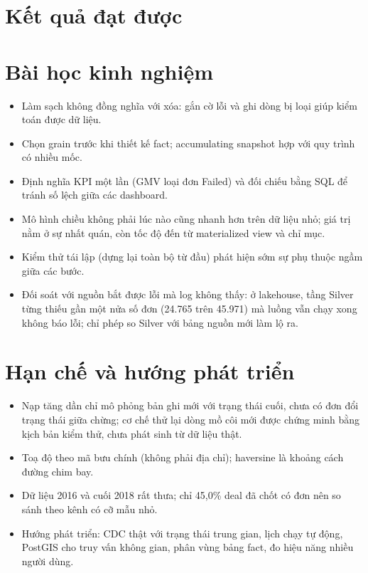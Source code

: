 \section{Kết quả đạt được}

\section{Bài học kinh nghiệm}
\begin{itemize}
  \item Làm sạch không đồng nghĩa với xóa: gắn cờ lỗi và ghi dòng bị loại giúp kiểm toán được dữ liệu.
  \item Chọn grain trước khi thiết kế fact; accumulating snapshot hợp với quy trình có nhiều mốc.
  \item Định nghĩa KPI một lần (GMV loại đơn Failed) và đối chiếu bằng SQL để tránh số lệch giữa các dashboard.
  \item Mô hình chiều không phải lúc nào cũng nhanh hơn trên dữ liệu nhỏ; giá trị nằm ở sự nhất quán, còn tốc độ đến từ materialized view và chỉ mục.
  \item Kiểm thử tái lập (dựng lại toàn bộ từ đầu) phát hiện sớm sự phụ thuộc ngầm giữa các bước.
  \item Đối soát với nguồn bắt được lỗi mà log không thấy: ở lakehouse, tầng Silver từng thiếu gần một nửa số đơn (24.765 trên 45.971) mà luồng vẫn chạy xong không báo lỗi; chỉ phép so Silver với bảng nguồn mới làm lộ ra.
\end{itemize}

\section{Hạn chế và hướng phát triển}
\begin{itemize}
  \item Nạp tăng dần chỉ mô phỏng bản ghi mới với trạng thái cuối, chưa có đơn đổi trạng thái giữa chừng; cơ chế thử lại dòng mồ côi mới được chứng minh bằng kịch bản kiểm thử, chưa phát sinh từ dữ liệu thật.
  \item Toạ độ theo mã bưu chính (không phải địa chỉ); haversine là khoảng cách đường chim bay.
  \item Dữ liệu 2016 và cuối 2018 rất thưa; chỉ 45,0\% deal đã chốt có đơn nên so sánh theo kênh có cỡ mẫu nhỏ.
  \item Hướng phát triển: CDC thật với trạng thái trung gian, lịch chạy tự động, PostGIS cho truy vấn không gian, phân vùng bảng fact, đo hiệu năng nhiều người dùng.
\end{itemize}
